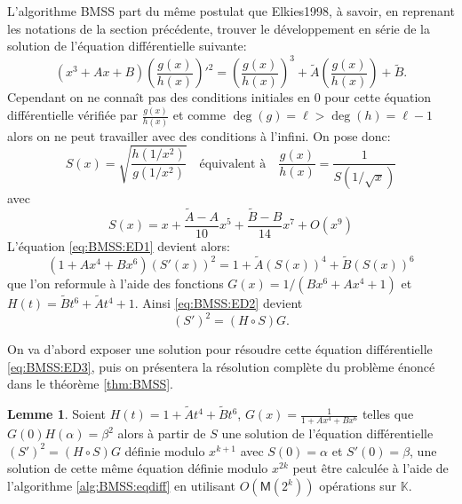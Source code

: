 \documentclass[10pt,a4paper]{book}
\theoremstyle{plain}
\theoremstyle{definition}
\newtheorem{lem}[thm]{Lemme}
\theoremstyle{definition}
\theoremstyle{definition}
\theoremstyle{definition}
\theoremstyle{remark}
\theoremstyle{remark}
\begin{document}
L'algorithme BMSS part du même postulat que Elkies1998, à savoir, en reprenant les notations de la section précédente, trouver le développement en série de la solution de l'équation différentielle suivante:   
\begin{equation}
\label{eq:BMSS:ED1}
(x^3+Ax+B)\left(\frac{g(x)}{h(x)} \right)'^2=  \left(\frac{g(x)}{h(x)} \right)^3 + \tilde{A} \left(\frac{g(x)}{h(x)} \right) + \tilde{B}.
\end{equation}
Cependant on ne connaît pas des conditions initiales en $0$ pour cette équation différentielle vérifiée par $\frac{g(x)}{h(x)}$ et comme $\deg(g)=\ell> \deg(h)= \ell-1$ alors on ne peut travailler avec des conditions à l'infini. On pose donc:
\begin{equation}
S(x)=\sqrt{\frac{h(1/x^2)}{g(1/x^2)}} \quad \text{équivalent à} \quad \frac{g(x)}{h(x)}=\frac{1}{S(1/\sqrt{x})}
\end{equation} 
avec 
\begin{equation}
S(x)=x + \frac{\tilde{A}-A}{10}x^5+\frac{\tilde{B}-B}{14}x^7+O(x^9)
\end{equation}
L'équation \eqref{eq:BMSS:ED1} devient alors:
\begin{equation}
\label{eq:BMSS:ED2}
(1+Ax^4+Bx^6)(S'(x))^2=1+\tilde{A}(S(x))^4+\tilde{B}(S(x))^6
\end{equation}
que l'on reformule à l'aide des fonctions $G(x)=1/(Bx^6+Ax^4+1)$ et $H(t)=\tilde{B}t^6+\tilde{A}t^4+1$. Ainsi \eqref{eq:BMSS:ED2} devient 
\begin{equation}
\label{eq:BMSS:ED3}
(S')^2=(H \circ S) G.
\end{equation}

On va d'abord exposer une solution pour résoudre cette équation différentielle \eqref{eq:BMSS:ED3}, puis on présentera la résolution complète du problème énoncé dans le théorème \ref{thm:BMSS}. 

\begin{lem}
\label{lem:BMSS}
Soient $H(t)=1+\tilde{A}t^4+\tilde{B}t^6$, $G(x)=\frac{1}{1+Ax^4+Bx^6}$ telles que $G(0)H(\alpha)=\beta^2$ alors à partir de $S$ une solution de l'équation différentielle $(S')^2=(H \circ S) G$ définie modulo $x^{k+1}$ avec $S(0)=\alpha$ et $S'(0)=\beta$, une solution de cette même équation définie modulo $x^{2k}$ peut être calculée à l'aide de l'algorithme \ref{alg:BMSS:eqdiff} en utilisant $O(\mathsf{M}(2^k))$ opérations sur $\mathbb{K}$.
\end{lem}
\end{document}
